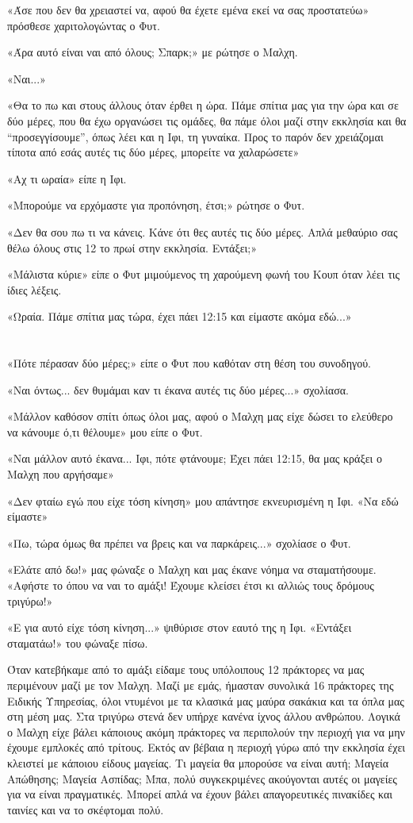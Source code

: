 \documentclass[12pt,twoside, openany]{book}
\begin{document}
«Άσε που δεν θα χρειαστεί να, αφού θα έχετε εμένα εκεί να σας προστατεύω» πρόσθεσε χαριτολογώντας ο Φυτ.

«Άρα αυτό είναι ναι από όλους; Σπαρκ;» με ρώτησε ο Μαλχη.

«Ναι...»

«Θα το πω και στους άλλους όταν έρθει η ώρα. Πάμε σπίτια μας για την ώρα και σε δύο μέρες, που θα έχω οργανώσει τις ομάδες, θα πάμε όλοι μαζί στην εκκλησία και θα “προσεγγίσουμε”, όπως λέει και η Ιφι, τη γυναίκα. Προς το παρόν δεν χρειάζομαι τίποτα από εσάς αυτές τις δύο μέρες, μπορείτε να χαλαρώσετε»

«Αχ τι ωραία» είπε η Ιφι.

«Μπορούμε να ερχόμαστε για προπόνηση, έτσι;» ρώτησε ο Φυτ.

«Δεν θα σου πω τι να κάνεις. Κάνε ότι θες αυτές τις δύο μέρες. Απλά μεθαύριο σας θέλω όλους στις 12 το πρωί στην εκκλησία. Εντάξει;»

«Μάλιστα κύριε» είπε ο Φυτ μιμούμενος τη χαρούμενη φωνή του Κουπ όταν λέει τις ίδιες λέξεις.

«Ωραία. Πάμε σπίτια μας τώρα, έχει πάει 12:15 και είμαστε ακόμα εδώ...»

\chapter{}

«Πότε πέρασαν δύο μέρες;» είπε ο Φυτ που καθόταν στη θέση του συνοδηγού.

«Ναι όντως... δεν θυμάμαι καν τι έκανα αυτές τις δύο μέρες...» σχολίασα.

«Μάλλον καθόσον σπίτι όπως όλοι μας, αφού ο Μαλχη μας είχε δώσει το ελεύθερο να κάνουμε ό,τι θέλουμε» μου είπε ο Φυτ.

«Ναι μάλλον αυτό έκανα... Ιφι, πότε φτάνουμε; Έχει πάει 12:15, θα μας κράξει ο Μαλχη που αργήσαμε»

«Δεν φταίω εγώ που είχε τόση κίνηση» μου απάντησε εκνευρισμένη η Ιφι. «Να εδώ είμαστε»

«Πω, τώρα όμως θα πρέπει να βρεις και να παρκάρεις...» σχολίασε ο Φυτ.

«Ελάτε από δω!» μας φώναξε ο Μαλχη και μας έκανε νόημα να σταματήσουμε. «Αφήστε το όπου να ναι το αμάξι! Έχουμε κλείσει έτσι κι αλλιώς τους δρόμους τριγύρω!»

«Ε για αυτό είχε τόση κίνηση...» ψιθύρισε στον εαυτό της η Ιφι. «Εντάξει σταματάω!» του φώναξε πίσω.

Όταν κατεβήκαμε από το αμάξι είδαμε τους υπόλοιπους 12 πράκτορες να μας περιμένουν μαζί με τον Μαλχη. Μαζί με εμάς, ήμασταν συνολικά 16 πράκτορες της Ειδικής Υπηρεσίας, όλοι ντυμένοι με τα κλασικά μας μαύρα σακάκια και τα όπλα μας στη μέση μας. Στα τριγύρω στενά δεν υπήρχε κανένα ίχνος άλλου ανθρώπου. Λογικά ο Μαλχη είχε βάλει κάποιους ακόμη πράκτορες να περιπολούν την περιοχή για να μην έχουμε εμπλοκές από τρίτους. Εκτός αν βέβαια η περιοχή γύρω από την εκκλησία έχει κλειστεί με κάποιου είδους μαγείας. Τι μαγεία θα μπορούσε να είναι αυτή; Μαγεία Απώθησης; Μαγεία Ασπίδας; Μπα, πολύ συγκεκριμένες ακούγονται αυτές οι μαγείες για να είναι πραγματικές. Μπορεί απλά να έχουν βάλει απαγορευτικές πινακίδες και ταινίες και να το σκέφτομαι πολύ.
\end{document}
